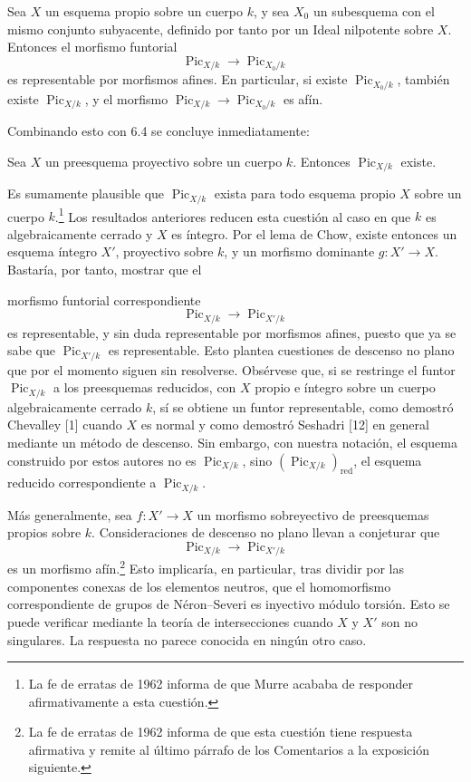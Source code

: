  Sea $X$ un esquema propio sobre un cuerpo $k$, y sea
$X_0$ un subesquema con el mismo conjunto subyacente, definido por tanto por un
Ideal nilpotente sobre $X$. Entonces el morfismo funtorial
\[
\operatorname{Pic}_{X/k}\longrightarrow\operatorname{Pic}_{X_0/k}
\]
es representable por morfismos afines. En particular, si existe
$\operatorname{Pic}_{X_0/k}$, también existe $\operatorname{Pic}_{X/k}$, y el
morfismo $\operatorname{Pic}_{X/k}\longrightarrow\operatorname{Pic}_{X_0/k}$
es afín.

Combinando esto con 6.4 se concluye inmediatamente:

 Sea $X$ un preesquema proyectivo sobre un cuerpo $k$.
Entonces $\operatorname{Pic}_{X/k}$ existe.

 Es sumamente plausible que
$\operatorname{Pic}_{X/k}$ exista para todo esquema propio $X$ sobre un cuerpo
$k$.\footnote{La fe de erratas de 1962 informa de que Murre acababa de responder
afirmativamente a esta cuestión.} Los resultados anteriores reducen esta
cuestión al caso en que $k$ es algebraicamente cerrado y $X$ es íntegro. Por el
lema de Chow, existe entonces un esquema íntegro $X'$, proyectivo sobre $k$, y
un morfismo dominante $g:X'\longrightarrow X$. Bastaría, por tanto, mostrar que
el

morfismo funtorial correspondiente
\[
\operatorname{Pic}_{X/k}\longrightarrow\operatorname{Pic}_{X'/k}
\]
es representable, y sin duda representable por morfismos afines, puesto que ya
se sabe que $\operatorname{Pic}_{X'/k}$ es representable. Esto plantea
cuestiones de descenso no plano que por el momento siguen sin resolverse.
Obsérvese que, si se restringe el funtor $\operatorname{Pic}_{X/k}$ a los
preesquemas reducidos, con $X$ propio e íntegro sobre un cuerpo algebraicamente
cerrado $k$, sí se obtiene un funtor representable, como demostró Chevalley [1]
cuando $X$ es normal y como demostró Seshadri [12] en general mediante un
método de descenso. Sin embargo, con nuestra notación, el esquema construido
por estos autores no es $\operatorname{Pic}_{X/k}$, sino
$(\operatorname{Pic}_{X/k})_{\mathrm{red}}$, el esquema reducido correspondiente
a $\operatorname{Pic}_{X/k}$.

 Más generalmente, sea $f:X'\longrightarrow X$ un
morfismo sobreyectivo de preesquemas propios sobre $k$. Consideraciones de
descenso no plano llevan a conjeturar que
\[
\operatorname{Pic}_{X/k}\longrightarrow\operatorname{Pic}_{X'/k}
\]
es un morfismo afín.\footnote{La fe de erratas de 1962 informa de que esta cuestión
tiene respuesta afirmativa y remite al último párrafo de los Comentarios a la
exposición siguiente.} Esto implicaría, en particular, tras dividir por las
componentes conexas de los elementos neutros, que el homomorfismo
correspondiente de grupos de Néron--Severi es inyectivo módulo torsión. Esto se
puede verificar mediante la teoría de intersecciones cuando $X$ y $X'$ son no
singulares. La respuesta no parece conocida en ningún otro caso.

